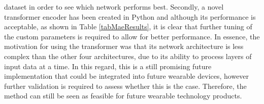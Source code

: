 dataset in order to see which network performs best. Secondly, a novel transformer encoder has 
been created in Python and although its performance is acceptable, as shown in Table \ref{tabMaeResults}, it is clear 
that further tuning of the custom parameters is required to allow for better performance. In essence, the motivation 
for using the transformer was that its network architecture is less complex than the other four architectures, due to its 
ability to process layers of input data at a time. In this regard, this is a still promising future 
implementation that could be integrated into future wearable devices, however further validation 
is required to assess whether this is the case. Therefore, the method can still be seen as feasible for future wearable technology products.